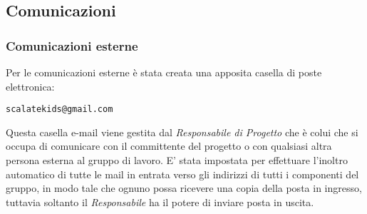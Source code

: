 \documentclass{scalatekids-article}
\begin{document}
\subsection{Comunicazioni}
\subsubsection{Comunicazioni esterne}
Per le comunicazioni esterne è stata creata una apposita casella di poste elettronica:
\begin{center}
  \verb=scalatekids@gmail.com=
\end{center}
Questa casella e-mail viene gestita dal \textit{Responsabile di Progetto} che è
colui che si occupa di comunicare con il committente del progetto o con
qualsiasi altra persona esterna al gruppo di lavoro. E' stata impostata per
effettuare l'inoltro automatico di tutte le mail in entrata verso gli indirizzi
di tutti i componenti del gruppo, in modo tale che ognuno possa ricevere una
copia della posta in ingresso, tuttavia soltanto il \textit{Responsabile} ha il
potere di inviare posta in uscita.
\end{document}
